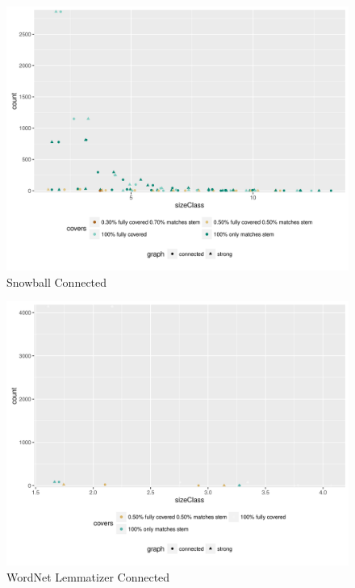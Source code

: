 \documentclass[11pt]{article}
\newenvironment{code}{\captionsetup{type=listing}}{}
\begin{document}
\begin{figure}[H]
\centering
\includegraphics[scale=0.8]{SnowballStemmerconnected.png}
\caption{Snowball Connected}
\label{fig:snbc}
\end{figure}
\begin{figure}[H]
\centering
\includegraphics[scale=0.8]{WordNetLemmatizerconnected.png}
\caption{WordNet Lemmatizer Connected}
\label{fig:wrdnc}
\end{figure}
\begin{code}
\label{code:gsc}
\end{code}
\begin{code}
 \label{code:sccgr}
\end{code}
\newpage
\end{document}
